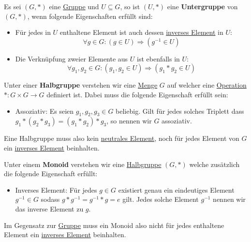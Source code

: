 \documentclass[../../main.tex]{subfiles}
\begin{document}
		\begin{definition}[Untergruppe]
			\label{def:Untergruppe}
			Es sei $(G,*)$ eine \hyperref[def:Gruppe]{Gruppe} und $U \subseteq G$, so ist $(U,*)$ eine \textbf{Untergruppe} von $(G,*)$, wenn folgende Eigenschaften erfüllt sind:  
			\begin{itemize}
				\item Für jedes in $U$ enthaltene Element ist auch dessen \hyperref[def:inversesElement]{inverses Element} in $U$: $$\forall g \in G: (g \in U) \Rightarrow (g^{-1} \in U)$$
				\item Die Verknüpfung zweier Elemente aus $U$ ist ebenfalls in $U$: $$\forall g_1,g_2 \in G: (g_1, g_2 \in U) \Rightarrow (g_1 * g_2 \in U)$$
			\end{itemize}
		\end{definition}
	
		\begin{definition}[Halbgruppe]
			\label{def:Halbgruppe}
			Unter einer \textbf{Halbgruppe} verstehen wir eine \hyperref[def:Menge]{Menge} $G$ auf welcher eine \hyperref[def:Operation]{Operation} $*: G \times G \rightarrow G$ definiert ist. Dabei muss die folgende Eigenschaft erfüllt sein:
			\begin{itemize}
				\item Assoziativ: Es seien $g_1, g_2,g_3 \in G$ beliebig. Gilt für jedes solches Triplett dass $g_1 * (g_2 * g_3) = (g_1 * g_2) * g_3$, so nennen wir $G$ assoziativ. 
			\end{itemize}
			Eine Halbgruppe muss also kein \hyperref[def:neutralesElement]{neutrales Element}, noch für jedes Element von $G$ ein \hyperref[def:inversesElement]{inverses Element} beinhalten. 
		\end{definition}
	
		\begin{definition}[Monoid]
			Unter einem \textbf{Monoid} verstehen wir eine \hyperref[def:Halbgruppe]{Halbgruppe} $(G,*)$ welche zusätzlich die folgende Eigenschaft erfüllt:
			\begin{itemize}
				\item Inverses Element: Für jedes $g \in G$ existiert genau ein eindeutiges Element $g^{-1} \in G$ sodass $g * g^{-1} = g^{-1} * g = e$ gilt. Jedes solche Element $g^{-1}$ nennen wir das inverse Element zu $g$.
			\end{itemize}
			Im Gegensatz zur \hyperref[def:Gruppe]{Gruppe} muss ein Monoid also nicht für jedes enthaltene Element ein \hyperref[def:inversesElement]{inverses Element} beinhalten.
		\end{definition}
	
\end{document}
